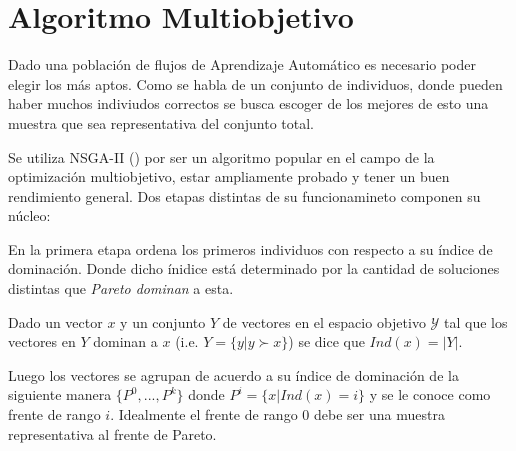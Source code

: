 \section{Algoritmo Multiobjetivo}


Dado una poblaci\'on de flujos de Aprendizaje Autom\'atico es necesario poder elegir los m\'as aptos. Como se habla de un conjunto de individuos, donde pueden haber muchos indiviudos correctos se busca escoger de los mejores de esto una muestra que sea representativa del conjunto total.

Se utiliza NSGA-II (\cite{deb2002fast}) por ser un algoritmo popular en el campo de la optimizaci\'on multiobjetivo, estar ampliamente probado y tener un buen rendimiento general. Dos etapas distintas de su funcionamineto componen su n\'ucleo:

En la primera etapa ordena los primeros individuos con respecto a su \'indice de dominaci\'on. Donde dicho \'inidice  est\'a determinado por la cantidad de soluciones distintas que \textit{Pareto dominan} a esta.
\begin{definition}
    Dado un vector $x$ y un conjunto $Y$ de vectores en el espacio objetivo $\mathcal{Y}$ tal que los vectores en $Y$ dominan a $x$ (i.e. $Y = \{y | y \succ x\}$) se dice que $Ind(x) = |Y|$.
\end{definition}
Luego los vectores se agrupan de acuerdo a su \'indice de dominaci\'on  de la siguiente manera
$\{P^0, ..., P^k\}$ donde  $P^i = \{x | Ind(x) = i\}$ y se le conoce como frente de rango $i$. Idealmente el frente de rango $0$ debe ser una muestra representativa al frente de Pareto.

